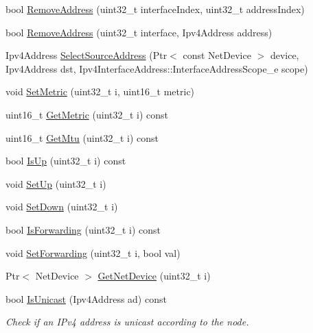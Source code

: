 \begin{DoxyCompactItemize}
\item 
bool \hyperlink{classns3_1_1Ipv4RouterL3Protocol_a78a2d198be0f25c16037f98323b45ea2}{Remove\-Address} (uint32\-\_\-t interface\-Index, uint32\-\_\-t address\-Index)
\item 
bool \hyperlink{classns3_1_1Ipv4RouterL3Protocol_a81bad2ef6599a38a7b35fe8b0ce8d30f}{Remove\-Address} (uint32\-\_\-t interface, Ipv4\-Address address)
\item 
Ipv4\-Address \hyperlink{classns3_1_1Ipv4RouterL3Protocol_ad7287d5d0a844bb61fd72476ad8e9ee7}{Select\-Source\-Address} (Ptr$<$ const Net\-Device $>$ device, Ipv4\-Address dst, Ipv4\-Interface\-Address\-::\-Interface\-Address\-Scope\-\_\-e scope)
\item 
void \hyperlink{classns3_1_1Ipv4RouterL3Protocol_a5bbc44739ecc7fe8e995e5f5dcd9ce89}{Set\-Metric} (uint32\-\_\-t i, uint16\-\_\-t metric)
\item 
uint16\-\_\-t \hyperlink{classns3_1_1Ipv4RouterL3Protocol_a046d9e4b77a15e4d3bee2e415c8070c3}{Get\-Metric} (uint32\-\_\-t i) const 
\item 
uint16\-\_\-t \hyperlink{classns3_1_1Ipv4RouterL3Protocol_a9624b73c4e19e1a4c4155c2b6f35c76d}{Get\-Mtu} (uint32\-\_\-t i) const 
\item 
bool \hyperlink{classns3_1_1Ipv4RouterL3Protocol_a046298cf4c213797e047e7344701c8f5}{Is\-Up} (uint32\-\_\-t i) const 
\item 
void \hyperlink{classns3_1_1Ipv4RouterL3Protocol_a3352a473d2724c3e90f13e7116be3b5c}{Set\-Up} (uint32\-\_\-t i)
\item 
void \hyperlink{classns3_1_1Ipv4RouterL3Protocol_a88b0686519678bbe3e3a10aa82bf5cea}{Set\-Down} (uint32\-\_\-t i)
\item 
bool \hyperlink{classns3_1_1Ipv4RouterL3Protocol_a3a0efdbc3ff924c388a0db9bd8387aea}{Is\-Forwarding} (uint32\-\_\-t i) const 
\item 
void \hyperlink{classns3_1_1Ipv4RouterL3Protocol_aba2f18e349db994598b8b715e0557ac9}{Set\-Forwarding} (uint32\-\_\-t i, bool val)
\item 
Ptr$<$ Net\-Device $>$ \hyperlink{classns3_1_1Ipv4RouterL3Protocol_a6e4db6eb5d22d3ef5f9fba31c347ba00}{Get\-Net\-Device} (uint32\-\_\-t i)
\item 
bool \hyperlink{classns3_1_1Ipv4RouterL3Protocol_af45da819ef800c1fa6652ff38acd0abe}{Is\-Unicast} (Ipv4\-Address ad) const 
\begin{DoxyCompactList}\small\item\em Check if an I\-Pv4 address is unicast according to the node. \end{DoxyCompactList}\end{DoxyCompactItemize}
